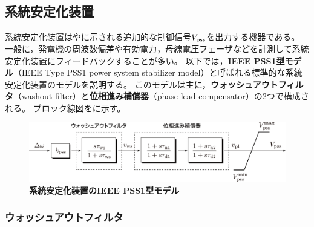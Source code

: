 \documentclass[tombow,dvipdfmx]{corona-a5-1.1}
\begin{document}
\begin{例}[xxx]\label{ex:avreffect}
\end{例}

\subsection{系統安定化装置}\label{sec:pssov}

系統安定化装置はやに示される追加的な制御信号$V_{\rm pss}$を出力する機器である。
一般に，発電機の周波数偏差や有効電力，母線電圧フェーザなどを計測して系統安定化装置にフィードバックすることが多い。
以下では，\textbf{IEEE PSS1型モデル}（IEEE Type PSS1 power system stabilizer model）と呼ばれる標準的な系統安定化装置のモデルを説明する\cite[9.2節]{ieee2016ieee}。
このモデルは主に，\textbf{ウォッシュアウトフィルタ}（washout filter）と\textbf{位相進み補償器}（phase-lead compensator）の2つで構成される。
ブロック線図をに示す。

\begin{figure}[t]
\centering
\includegraphics[width = .99\linewidth]{figs/pss1}
\medskip
\caption{\textbf{系統安定化装置のIEEE PSS1型モデル}}
\label{fig:pss1}
\medskip
\end{figure}


\subsubsection{ウォッシュアウトフィルタ}
\end{document}
